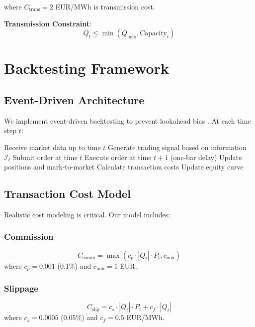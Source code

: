 \documentclass[12pt,a4paper]{article}
\begin{document}
where $C_{\text{trans}} = 2$ EUR/MWh is transmission cost.

\textbf{Transmission Constraint}:
\begin{equation}
Q_t \leq \min(Q_{\max}, \text{Capacity}_t)
\end{equation}

\section{Backtesting Framework}
\label{sec:backtesting}

\subsection{Event-Driven Architecture}

We implement event-driven backtesting to prevent lookahead bias \citep{prado2018advances}. At each time step $t$:

\begin{algorithmic}[1]
\STATE Receive market data up to time $t$
\STATE Generate trading signal based on information $\mathcal{I}_t$
\STATE Submit order at time $t$
\STATE Execute order at time $t+1$ (one-bar delay)
\STATE Update positions and mark-to-market
\STATE Calculate transaction costs
\STATE Update equity curve
\end{algorithmic}

\subsection{Transaction Cost Model}

Realistic cost modeling is critical. Our model includes:

\subsubsection{Commission}
\begin{equation}
C_{\text{comm}} = \max(c_p \cdot |Q_t| \cdot P_t, c_{\min})
\end{equation}
where $c_p = 0.001$ (0.1\%) and $c_{\min} = 1$ EUR.

\subsubsection{Slippage}
\begin{equation}
C_{\text{slip}} = c_s \cdot |Q_t| \cdot P_t + c_f \cdot |Q_t|
\end{equation}
where $c_s = 0.0005$ (0.05\%) and $c_f = 0.5$ EUR/MWh.
\end{document}
